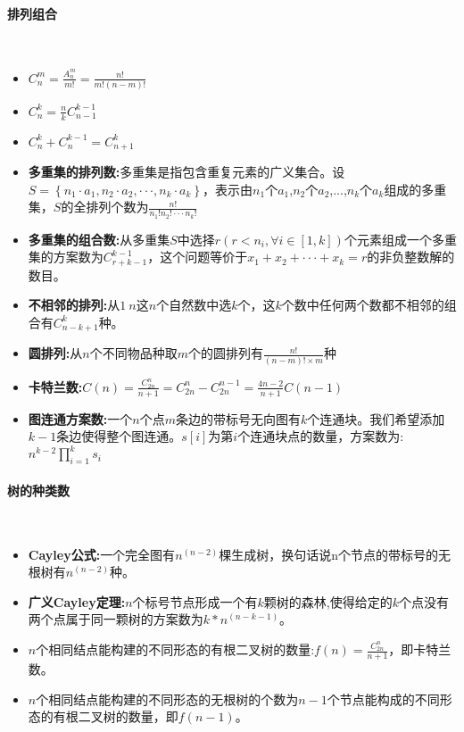 \paragraph{排列组合}~{}
\\
\begin{itemize}
\item $C_{n}^{m}=\frac{A_{n}^{m}}{m!}=\frac{n!}{m!(n-m)!}$
\item $C_{n}^{k}=\frac{n}{k}C_{n-1}^{k-1}$
\item $C_{n}^{k}+C_{n}^{k-1}=C_{n+1}^{k}$
\item \textbf{多重集的排列数:}多重集是指包含重复元素的广义集合。设$S= \left\{ n_1 \cdot a_1,n_2 \cdot a_2, \cdot \cdot \cdot,n_k \cdot a_k \right\}$，表示由$n_1$个$a_1$,$n_2$个$a_2$,...,$n_k$个$a_k$组成的多重集，$S$的全排列个数为$\frac{n!}{n_1!n_2! \cdot \cdot \cdot n_k!}$
\item \textbf{多重集的组合数:}从多重集$S$中选择$r(r<n_i,\forall i \in [1, k])$个元素组成一个多重集的方案数为$C_{r+k-1}^{k-1}$，这个问题等价于$x_1+x_2+ \cdot \cdot \cdot +x_k=r$的非负整数解的数目。
\item \textbf{不相邻的排列:}从$1~n$这$n$个自然数中选$k$个，这$k$个数中任何两个数都不相邻的组合有$C_{n-k+1}^{k}$种。
\item \textbf{圆排列:}从$n$个不同物品种取$m$个的圆排列有$\frac{n!}{(n-m)! \times m}$种
\item \textbf{卡特兰数:}$C(n)=\frac{C_{2n}^{n}}{n+1}=C_{2n}^{n}-C_{2n}^{n-1}=\frac{4n-2}{n+1}C(n-1)$
\item \textbf{图连通方案数:}一个$n$个点$m$条边的带标号无向图有$k$个连通块。我们希望添加$k-1$条边使得整个图连通。$s[i]$为第$i$个连通块点的数量，方案数为:$n^{k-2}\prod_{i=1}^{k}s_i$
\end{itemize}


\paragraph{树的种类数}~{}
\\
\begin{itemize}
\item \textbf{Cayley公式:}一个完全图有$n^{(n-2)}$棵生成树，换句话说n个节点的带标号的无根树有$n^{(n-2)}$种。
\item \textbf{广义Cayley定理:}$n$个标号节点形成一个有$k$颗树的森林,使得给定的$k$个点没有两个点属于同一颗树的方案数为$k*n^{(n−k−1)}$。
\item $n$个相同结点能构建的不同形态的有根二叉树的数量:$f(n)=\frac{C_{2n}^{n}}{n+1}$，即卡特兰数。
\item $n$个相同结点能构建的不同形态的无根树的个数为$n-1$个节点能构成的不同形态的有根二叉树的数量，即$f(n-1)$。
\end{itemize}